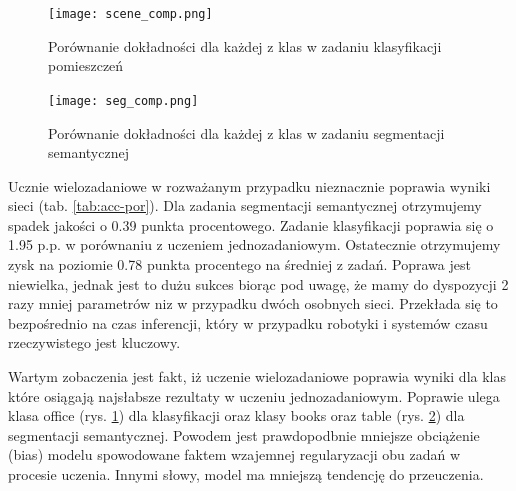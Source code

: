 \begin{figure}[ht!]
    \centering
    \texttt{[image: scene\_comp.png]}
    \caption{Porównanie dokładności dla każdej z klas w zadaniu klasyfikacji pomieszczeń}
    \label{fig:scene_comp}
\end{figure}

\begin{figure}[ht!]
    \centering
    \texttt{[image: seg\_comp.png]}
    \caption{Porównanie dokładności dla każdej z klas w zadaniu segmentacji semantycznej}
    \label{fig:seg_comp}
\end{figure}
Ucznie wielozadaniowe w rozważanym przypadku nieznacznie poprawia wyniki sieci (tab. \ref{tab:acc-por}). Dla zadania segmentacji semantycznej otrzymujemy spadek jakości o 0.39 punkta procentowego. Zadanie klasyfikacji poprawia się o 1.95 p.p. w porównaniu z uczeniem jednozadaniowym. Ostatecznie otrzymujemy zysk na poziomie 0.78 punkta procentego na średniej z zadań. Poprawa jest niewielka, jednak jest to dużu sukces biorąc pod uwagę, że mamy do dyspozycji 2 razy mniej parametrów niz w przypadku dwóch osobnych sieci. Przekłada się to bezpośrednio na czas inferencji, który w przypadku robotyki i systemów czasu rzeczywistego jest kluczowy.

Wartym zobaczenia jest fakt, iż uczenie wielozadaniowe poprawia wyniki dla klas które osiągają najsłabsze rezultaty w uczeniu jednozadaniowym. Poprawie ulega klasa office (rys. \ref{fig:scene_comp}) dla klasyfikacji oraz klasy books oraz table (rys. \ref{fig:seg_comp}) dla segmentacji semantycznej. Powodem jest prawdopodbnie mniejsze obciążenie (bias) modelu spowodowane faktem wzajemnej regularyzacji obu zadań w procesie uczenia. Innymi słowy, model ma mniejszą tendencję do przeuczenia.